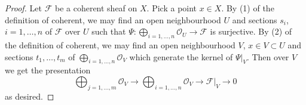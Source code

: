 \documentclass[10pt,a4paper]{amsart}
\theoremstyle{plain}
\theoremstyle{definition}
\theoremstyle{remark}
\numberwithin{equation}{subsection}
\begin{document}
\begin{proof}
Let $\mathcal{F}$ be a coherent sheaf on $X$.
Pick a point $x \in X$.
By (1) of the definition of coherent, we may find an open neighbourhood $U$
and sections $s_i$, $i = 1, \ldots, n$ of $\mathcal{F}$ over $U$
such that $\Psi : \bigoplus_{i = 1, \ldots, n} \mathcal{O}_U \to \mathcal{F}$
is surjective. By (2) of the definition of coherent, we may find
an open neighbourhood $V$, $x \in V \subset U$ and sections
$t_1, \ldots, t_m$ of $\bigoplus_{i = 1, \ldots, n} \mathcal{O}_V$
which generate the kernel of $\Psi|_V$. Then over $V$ we get the
presentation
$$
\bigoplus\nolimits_{j = 1, \ldots, m}
\mathcal{O}_V
\longrightarrow
\bigoplus\nolimits_{i = 1, \ldots, n}
\mathcal{O}_V
\to
\mathcal{F}|_V
\to
0
$$
as desired.
\end{proof}
\end{document}
